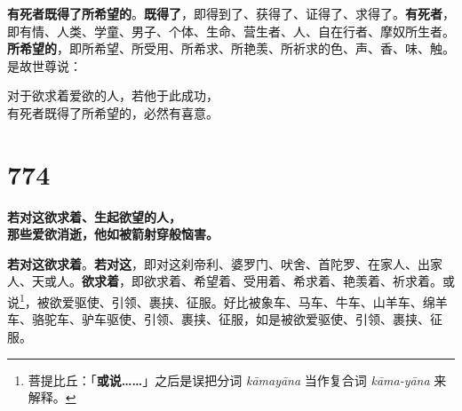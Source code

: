 \textbf{有死者既得了所希望的}。\textbf{既得了}，即得到了、获得了、证得了、求得了。\textbf{有死者}，即有情、人类、学童、男子、个体、生命、营生者、人、自在行者、摩奴所生者。\textbf{所希望的}，即所希望、所受用、所希求、所艳羡、所祈求的色、声、香、味、触。是故世尊说：


\begin{quoting}对于欲求着爱欲的人，若他于此成功，\\有死者既得了所希望的，必然有喜意。\end{quoting}


\section*{774}

\begin{quoting}\textbf{若对这欲求着、生起欲望的人，\\那些爱欲消逝，他如被箭射穿般恼害。}\end{quoting}


\textbf{若对这欲求着}。\textbf{若对这}，即对这刹帝利、婆罗门、吠舍、首陀罗、在家人、出家人、天或人。\textbf{欲求着}，即欲求着、希望着、受用着、希求着、艳羡着、祈求着。或说\footnote{菩提比丘：「\textbf{或说……}」之后是误把分词 \textit{kāmayāna} 当作复合词 \textit{kāma-yāna} 来解释。}，被欲爱驱使、引领、裹挟、征服。好比被象车、马车、牛车、山羊车、绵羊车、骆驼车、驴车驱使、引领、裹挟、征服，如是被欲爱驱使、引领、裹挟、征服。


